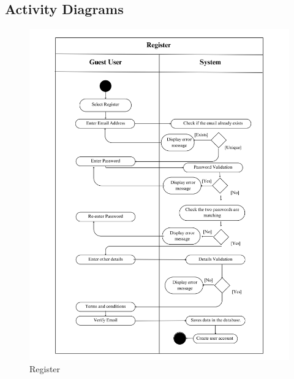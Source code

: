 \subsection{Activity Diagrams}

\begin{figure}[!h]
    \centering
    \includegraphics[width=1\textwidth]{Images/Activity Diagrams/1 Register crop.png}
    \caption{Register}
    \label{fig:activity-register}
\end{figure}

